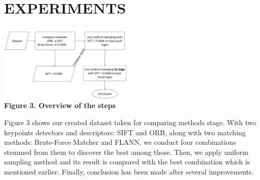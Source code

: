 \documentclass[letterpaper, 10 pt, conference]{ieeeconf}  %
\begin{document}
\section{EXPERIMENTS}
\begin{center}
\includegraphics[width=0.5\textwidth]{Presentation1.pdf} \\
\textbf{Figure 3. Overview of the steps}
\end{center}
\par
Figure 3 shows our created dataset taken for comparing methods stage. With two keypoints detectors and descriptors: SIFT and ORB, along with two matching methods: Brute-Force Matcher and FLANN, we conduct four combinations stemmed from them to discover the best among those. Then, we apply uniform sampling method and its result is compared with the best combination which is mentioned earlier. Finally, conclusion has been made after several improvements.\par
\end{document}
